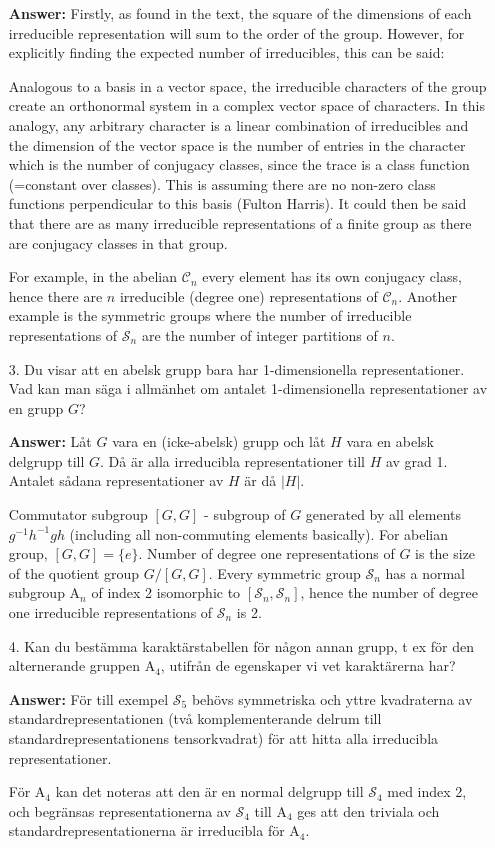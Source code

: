 \documentclass[12pt,a4paper]{article}
\theoremstyle{definition}
\theoremstyle{remark}
\numberwithin{equation}{section}
\newcommand{\1}{\mathbf{1}}
\newcommand{\0}{\mathbf{0}}
\newcommand{\Sym}{\mathcal{S}} %
\newcommand{\Cyc}{\mathcal{C}}%
\begin{document}
\begin{enumerate}
			 \textbf{Answer:} Firstly, as found in the text, the square of the dimensions of each irreducible representation will sum to the order of the group. However, for explicitly finding the expected number of irreducibles, this can be said:
			 
			 Analogous to a basis in a vector space, the irreducible characters of the group create an orthonormal system in a complex vector space of characters. In this analogy, any arbitrary character is a linear combination of irreducibles and the dimension of the vector space is the number of entries in the character which is the number of conjugacy classes, since the trace is a class function (=constant over classes). This is assuming there are no non-zero class functions perpendicular to this basis (Fulton Harris). It could then be said that there are as many irreducible representations of a finite group as there are conjugacy classes in that group.
			
			For example, in the abelian $\Cyc_n$ every element has its own conjugacy class, hence there are $n$ irreducible (degree one) representations of $\Cyc_n$. Another example is the symmetric groups where the number of irreducible representations of $\Sym_n$ are the number of integer partitions of $n$.
			
		\item[3.] Du visar att en abelsk grupp bara har 1-dimensionella representationer. Vad kan man säga i allmänhet om antalet 1-dimensionella representationer av en grupp $G$?
		
			 \textbf{Answer:} Låt $G$ vara en (icke-abelsk) grupp och låt $H$ vara en abelsk delgrupp till $G$. Då är alla irreducibla representationer till $H$ av grad 1. Antalet sådana representationer av $H$ är då $|H|$. 
			 
			 
			 
			 Commutator subgroup $[G,G]$ - subgroup of $G$ generated by all elements $g^{-1}h^{-1}gh$ (including all non-commuting elements basically). For abelian group, $[G,G] = \{e\}$. Number of degree one representations of $G$ is the size of the quotient group $G/[G,G]$. Every symmetric group $\Sym_n$ has a normal subgroup $\text{A}_n$ of index 2 isomorphic to $[\Sym_n, \Sym_n]$, hence the number of degree one irreducible representations of $\Sym_n$ is 2.
			
		\item[4.] Kan du bestämma karaktärstabellen för någon annan grupp, t ex för den alternerande gruppen $\text{A}_4$, utifrån de egenskaper vi vet karaktärerna har?
		
			\textbf{Answer:} För till exempel $\Sym_5$ behövs symmetriska och yttre kvadraterna av standardrepresentationen (två komplementerande delrum till standardrepresentationens tensorkvadrat) för att hitta alla irreducibla representationer.
			
			För $\text{A}_4$ kan det noteras att den är en normal delgrupp till $\Sym_4$ med index 2, och begränsas representationerna av $\Sym_4$ till $\text{A}_4$ ges att den triviala och standardrepresentationerna är irreducibla för $\text{A}_4$.
			
	\end{enumerate}
				
\end{document}
